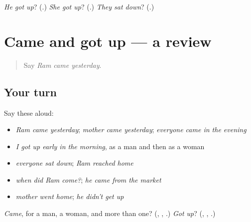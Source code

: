 \begin{tcolorbox}[breakable,colback=teal!4,colframe=teal!35!black,title={Before you move on}]
\emph{He got up}? (\textbf{}.) \emph{She got up}? (\textbf{}.) \emph{They sat down}? (\textbf{}.)
\end{tcolorbox}
\section[(dialogue)]{Came and got up — a review}

\label{lesson:MW-R160-came-and-got-up}



\begin{quote}
Say \emph{Ram came yesterday}.
\end{quote}

\subsection*{Your turn}
Say these aloud:

\begin{itemize}
\raggedright
  \item \emph{Ram came yesterday}; \emph{mother came yesterday}; \emph{everyone came in the evening}
  \item \emph{I got up early in the morning}, as a man and then as a woman
  \item \emph{everyone sat down}; \emph{Ram reached home}
  \item \emph{when did Ram come?}; \emph{he came from the market}
  \item \emph{mother went home}; \emph{he didn't get up}
\end{itemize}

\begin{tcolorbox}[breakable,colback=teal!4,colframe=teal!35!black,title={Before you move on}]
\emph{Came}, for a man, a woman, and more than one? (\textbf{}, \textbf{}, \textbf{}.) \emph{Got up}? (\textbf{}, \textbf{}, \textbf{}.)
\end{tcolorbox}
